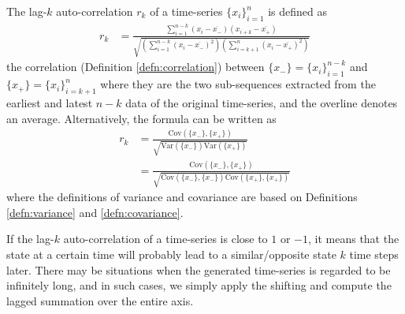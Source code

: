 \begin{defn}
\label{defn:autocorr}
The lag-$k$ auto-correlation $r_k$ of a time-series $\{x_i\}_{i=1}^{n}$ is defined as 
\begin{align*}
r_k &= \frac{\sum_{i=1}^{n-k}(x_i - \overline{x_{-}})(x_{i+k} - \overline{x_{+}})}{\sqrt{(\sum_{i=1}^{n-k}(x_i - \overline{x_{-}})^2) (\sum_{i=k+1}^{n}(x_i - \overline{x_{+}})^2)}}
\end{align*}
the correlation (Definition \ref{defn:correlation}) between $\{x_{-}\} = \{x_i\}_{i=1}^{n-k}$ and $\{x_{+}\} = \{x_i\}_{i=k+1}^{n}$ where they are the two sub-sequences extracted from the earliest and latest $n-k$ data of the original time-series, and the overline denotes an average. Alternatively, the formula can be written as
\begin{align*}
r_k &= \frac{\text{Cov}(\{x_{-}\},\{x_{+}\})}{\sqrt{\text{Var}(\{x_{-}\}) \text{Var}(\{x_{+}\})}} \\
&= \frac{\text{Cov}(\{x_{-}\},\{x_{+}\})}{\sqrt{\text{Cov}(\{x_{-}\}, \{x_{-}\}) \text{Cov}(\{x_{+}\}, \{x_{+}\})}}
\end{align*}
where the definitions of variance and covariance are based on Definitions \ref{defn:variance} and \ref{defn:covariance}.
\end{defn}
If the lag-$k$ auto-correlation of a time-series is close to $1$ or $-1$, it means that the state at a certain time will probably lead to a similar/opposite state $k$ time steps later. There may be situations when the generated time-series is regarded to be infinitely long, and in such cases, we simply apply the shifting and compute the lagged summation over the entire axis.


